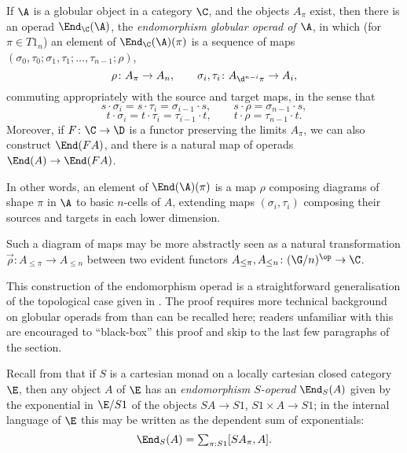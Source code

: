\begin{prop}\label{prop:endo-operad}
If $\A$ is a globular object in a category $\C$, and the objects $A_\pi$ exist, then there is an operad $\End_\C(\A)$, the \emph{endomorphism globular operad of $\A$}, in which (for $\pi \in T1_n$) an element of $\End_\C(\A)(\pi)$ is a sequence of maps $(\sigma_0, \tau_0;\sigma_1,\tau_1;\ldots ,\tau_{n-1}; \rho)$,
\[\rho\colon A_\pi \to A_n, \qquad \sigma_i, \tau_i\colon
A_{\d^{n-i}\pi} \to A_i,
\]
commuting appropriately with the source and target maps, in the sense that
\[s \cdot \sigma_i = s \cdot \tau_i = \sigma_{i-1} \cdot s, \qquad s
\cdot \rho = \sigma_{n-1} \cdot s,
\]
\[t \cdot \sigma_i = t \cdot \tau_i = \tau_{i-1} \cdot t, \qquad t
\cdot \rho = \tau_{n-1} \cdot t.
\]
Moreover, if $F \colon  \C \to \D$ is a functor preserving the limits $A_\pi$, we can also construct $\End(FA)$, and there is a natural map of operads $\End(A) \to \End(FA)$.
\end{prop}

In other words, an element of $\End(\A)(\pi)$ is a map $\rho$ composing diagrams of shape $\pi$ in $\A$ to basic $n$-cells of $A$, extending maps $(\sigma_i,\tau_i)$ composing their sources and targets in each lower dimension.

Such a diagram of maps may be more abstractly seen as a natural transformation $\vec{\rho}\colon  A_{\leq \pi} \to A_{\leq n}$ between two evident functors $A_{\leq \pi}, A_{\leq n}\colon  (\G/n)^\op \to \C$.

\proof
This construction of the endomorphism operad is a straightforward generalisation of the topological case given in \cite[9.2.7]{leinster:book}.  The proof requires more technical background on globular operads from \cite{leinster:book} than can be recalled here; readers unfamiliar with this are encouraged to ``black-box'' this proof and skip to the last few paragraphs of the section.

Recall from \cite[6.4]{leinster:book} that if $S$ is a cartesian monad on a locally cartesian closed category $\E$, then any object $A$ of $\E$ has an \emph{endomorphism $S$-operad} $\End_S(A)$ given by the exponential in $\E/S1$ of the objects $SA \to S1$, $S1 \times A \to S1$; in the internal language of $\E$ this may be written as the dependent sum of exponentials:
\[\End_S(A) = \textstyle \sum_{\pi : S1} [SA_\pi, A].\]

